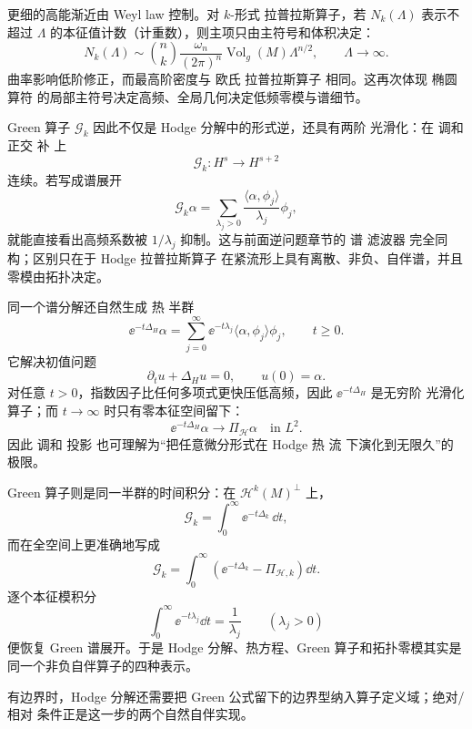 更细的高能渐近由 Weyl law 控制。对 $k$-形式 拉普拉斯算子，若 $N_k(\Lambda)$ 表示不超过 $\Lambda$ 的本征值计数（计重数），则主项只由主符号和体积决定：
\begin{equation*}N_k(\Lambda)
\sim
\binom{n}{k}
\frac{\omega_n}{(2\pi)^n}
\operatorname{Vol}_g(M)
\Lambda^{n/2},
\qquad \Lambda\to\infty.\end{equation*}
曲率影响低阶修正，而最高阶密度与 欧氏 拉普拉斯算子 相同。这再次体现 椭圆 算符 的局部主符号决定高频、全局几何决定低频零模与谱细节。

Green 算子 $\mathcal G_k$ 因此不仅是 Hodge 分解中的形式逆，还具有两阶 光滑化：在 调和 正交 补 上
\[
\mathcal G_k:H^s\to H^{s+2}
\]
连续。若写成谱展开
\[
\mathcal G_k\alpha
=\sum_{\lambda_j>0}
\frac{\langle\alpha,\phi_j\rangle}{\lambda_j}\phi_j,
\]
就能直接看出高频系数被 $1/\lambda_j$ 抑制。这与前面逆问题章节的 谱 滤波器 完全同构；区别只在于 Hodge 拉普拉斯算子 在紧流形上具有离散、非负、自伴谱，并且零模由拓扑决定。

同一个谱分解还自然生成 热 半群
\begin{equation*}\mathrm \ee^{-t\Delta_H}\alpha
=\sum_{j=0}^{\infty}
\mathrm \ee^{-t\lambda_j}
\langle\alpha,\phi_j\rangle\phi_j,
\qquad t\ge0.\end{equation*}
它解决初值问题
\[
\partial_tu+\Delta_Hu=0,
\qquad
u(0)=\alpha.
\]
对任意 $t>0$，指数因子比任何多项式更快压低高频，因此 $\mathrm \ee^{-t\Delta_H}$ 是无穷阶 光滑化 算子；而 $t\to\infty$ 时只有零本征空间留下：
\begin{equation*}\mathrm \ee^{-t\Delta_H}\alpha
\longrightarrow
\Pi_{\mathcal H}\alpha
\quad\text{in }L^2.\end{equation*}
因此 调和 投影 也可理解为“把任意微分形式在 Hodge 热 流 下演化到无限久”的极限。

Green 算子则是同一半群的时间积分：在 $\mathcal H^k(M)^\perp$ 上，
\begin{equation*}{
\mathcal G_k
=\int_0^{\infty}\mathrm \ee^{-t\Delta_k}\,\dd t,
}\end{equation*}
而在全空间上更准确地写成
\[
\mathcal G_k
=\int_0^{\infty}
\left(\mathrm \ee^{-t\Delta_k}-\Pi_{\mathcal H,k}\right)\dd t.
\]
逐个本征模积分
\[
\int_0^\infty\mathrm \ee^{-t\lambda_j}\dd t=\frac1{\lambda_j}
\qquad(\lambda_j>0)
\]
便恢复 Green 谱展开。于是 Hodge 分解、热方程、Green 算子和拓扑零模其实是同一个非负自伴算子的四种表示。

有边界时，Hodge 分解还需要把 Green 公式留下的边界型纳入算子定义域；绝对/相对 条件正是这一步的两个自然自伴实现。

